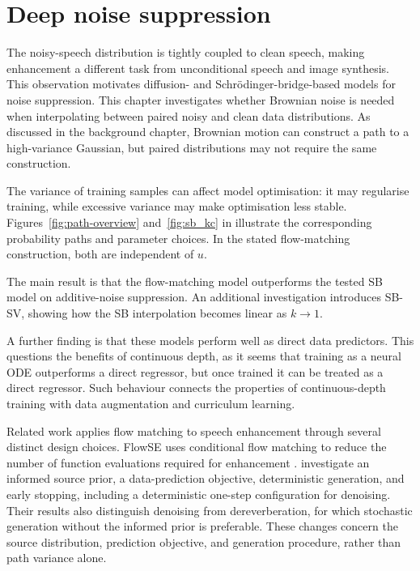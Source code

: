 \chapter{Deep noise suppression}
\label{ch:cfmse}
The noisy-speech distribution is tightly coupled to clean speech, making enhancement a different task from unconditional speech and image synthesis. This observation motivates diffusion- and Schr\"odinger-bridge-based models for noise suppression. This chapter investigates whether Brownian noise is needed when interpolating between paired noisy and clean data distributions. As discussed in the background chapter, Brownian motion can construct a path to a high-variance Gaussian, but paired distributions may not require the same construction.

The variance of training samples can affect model optimisation: it may regularise training, while excessive variance may make optimisation less stable. Figures~\ref{fig:path-overview} and~\ref{fig:sb_kc} in  illustrate the corresponding probability paths and parameter choices. In the stated flow-matching construction, both are independent of $u$.

The main result is that the flow-matching model outperforms the tested SB model on additive-noise suppression. An additional investigation introduces SB-SV, showing how the SB interpolation becomes linear as $k\rightarrow1$.

A further finding is that these models perform well as direct data predictors. This questions the benefits of continuous depth, as it seems that training as a neural ODE outperforms a direct regressor, but once trained it can be treated as a direct regressor. Such behaviour connects the properties of continuous-depth training with data augmentation and curriculum learning.

Related work applies flow matching to speech enhancement through several distinct design choices. FlowSE uses conditional flow matching to reduce the number of function evaluations required for enhancement \citep{leeFlowSEFlowMatchingbased2025}. \citet{korostikModifyingFlowMatching2025} investigate an informed source prior, a data-prediction objective, deterministic generation, and early stopping, including a deterministic one-step configuration for denoising. Their results also distinguish denoising from dereverberation, for which stochastic generation without the informed prior is preferable. These changes concern the source distribution, prediction objective, and generation procedure, rather than path variance alone.

